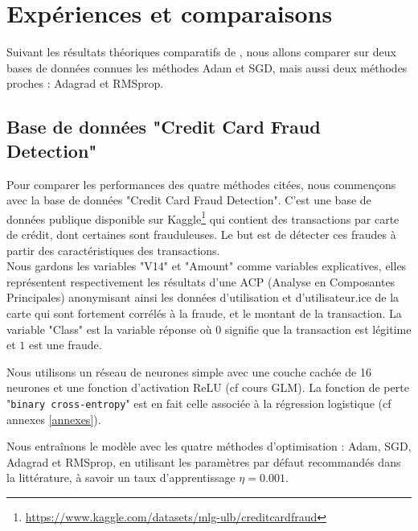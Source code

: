 \documentclass[a4paper,12pt]{article}
\begin{document}
\section{Expériences et comparaisons}

Suivant les résultats théoriques comparatifs de \cite{wilson2017}, nous allons comparer sur deux bases de données connues les méthodes Adam et SGD, mais aussi deux méthodes proches : Adagrad et RMSprop.

\subsection{Base de données "Credit Card Fraud Detection"}

Pour comparer les performances des quatre méthodes citées, nous commençons avec la base de données "Credit Card Fraud Detection". C'est une base de données publique disponible sur Kaggle\footnote{\url{https://www.kaggle.com/datasets/mlg-ulb/creditcardfraud}} qui contient des transactions par carte de crédit, dont certaines sont frauduleuses. Le but est de détecter ces fraudes à partir des caractéristiques des transactions. \\

Nous gardons les variables "V14" et "Amount" comme variables explicatives, elles représentent respectivement les résultats d'une ACP (Analyse en Composantes Principales) anonymisant ainsi les données d'utilisation et d'utilisateur.ice de la carte qui sont fortement corrélés à la fraude, et le montant de la transaction. La variable "Class" est la variable réponse où $0$ signifie que la transaction est légitime et $1$ est une fraude. \\
\par Nous utilisons un réseau de neurones simple avec une couche cachée de 16 neurones et une fonction d'activation ReLU (cf cours GLM). La fonction de perte "\texttt{binary cross-entropy}" est en fait celle associée à la régression logistique (cf annexes \ref{annexes}).
\par Nous entraînons le modèle avec les quatre méthodes d'optimisation : Adam, SGD, Adagrad et RMSprop, en utilisant les paramètres par défaut recommandés dans la littérature, à savoir un taux d'apprentissage $\eta=0.001$.\\
\end{document}
